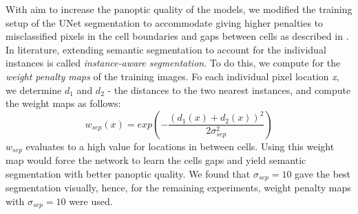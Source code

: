 \documentclass[journal]{IEEEtran}
\begin{document}
With aim to increase the panoptic quality of the models, we modified the training setup of the UNet segmentation to accommodate giving higher penalties to misclassified pixels in the cell boundaries and gaps between cells as described in \cite{nature_unet}. In literature, extending semantic segmentation to account for the individual instances is called \textit{instance-aware segmentation}. To do this, we compute for the \textit{weight penalty maps} of the training images.
Fo each individual pixel location \textit{x}, we determine \textit{$d_1$} and \textit{$d_2$} - the distances to the two nearest instances, and compute the weight maps as follows:
\begin{equation}
w_{sep}(x) = exp\left({-\frac{(d_1(x) + d_2(x))^2}{2\sigma^2_{sep}}}\right)
\end{equation}
$w_{sep}$ evaluates to a high value for locations in between  cells. Using this weight map would force the network to learn the cells gaps and yield semantic segmentation with better panoptic quality. We found that $\sigma_{sep} = 10$ gave the best segmentation visually, hence, for the remaining experiments, weight penalty maps with $\sigma_{sep} = 10$ were used. 
\end{document}
